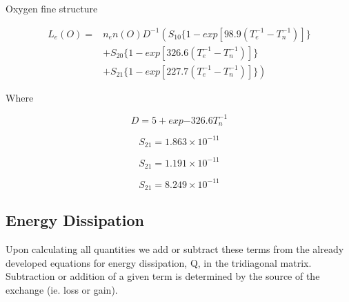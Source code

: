 \documentclass[10pt]{article}
\begin{document}
\noindent Oxygen fine structure

\begin{equation}
\begin{split}
L_{e}(O) =& n_{e} n(O) D^{-1} \left( S_{10} \lbrace 1 - exp{[98.9(T_{e}^{-1} - T_{n}^{-1})]} \rbrace \right. \\ & \left.
+ S_{20} \lbrace 1 - exp[326.6(T_{e}^{-1} - T_{n}^{-1})] \rbrace \right. \\ & \left.
+ S_{21} \lbrace 1-exp[227.7(T_{e}^{-1} - T_{n}^{-1})] \rbrace \right)
\end{split}
\end{equation}

\noindent Where

\begin{equation}
D = 5 + exp{-326.6 T_{n}^{-1}}
\end{equation}

\begin{equation}
S_{21} = 1.863 \times 10^{-11}
\end{equation}

\begin{equation}
S_{21} = 1.191 \times 10^{-11}
\end{equation}

\begin{equation}
S_{21} = 8.249 \times 10^{-11}
\end{equation}

\subsection{Energy Dissipation}
Upon calculating all quantities we add or subtract these terms from the already developed equations for energy dissipation, Q, in the tridiagonal matrix. Subtraction or addition of a given term is determined by the source of the exchange (ie. loss or gain).
\end{document}
